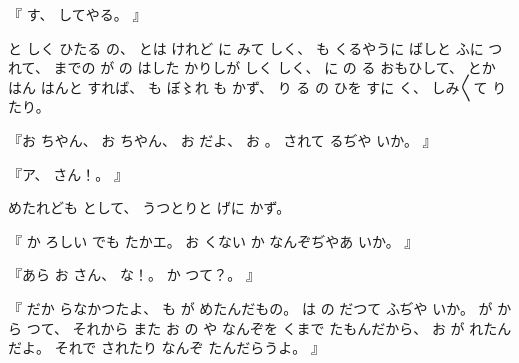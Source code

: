 %
『
す、
%
してやる。
』

%
と
しく
ひたる
の、
%
とは
けれど
に
みて
しく、
%
も
くるやうに
ばしと
ふに
つれて、
%
までの
が
の
はした
かりしが
しく
しく、
%
に
の
る
おもひして、
%
とか
はん
はんと
すれば、
%
も
ぼ〻れ%
も
かず、
%
%
り
る
の
ひを
すに
く、
%
しみ〳〵て
りたり。

%
『お
ちやん、
%
お
ちやん、
%
お
だよ、
%
お
。
%
されて%
るぢや
いか。
』

%
『ア、
%
さん！。
』

%
めたれども
として、
%
うつとりと
げに
かず。

%
『
か
ろしい
でも
たかエ。
%
お
くない
か
なんぞぢやあ
いか。
』

%
『あら
お
さん、
%
な！。
%
か
つて？。
』

%
『
だか
らなかつたよ、
%
も
が
めたんだもの。
%
は
の
だつて
ふぢや
いか。
%
が
から
つて、
%
それから
また
お
の
や
なんぞを
くまで
たもんだから、
%
お
が
れたんだよ。
%
それで
されたり
なんぞ
たんだらうよ。
』

